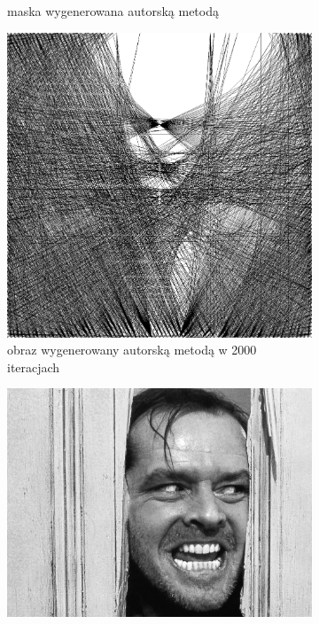 \begin{figure}[H]
\begin{subfigure}{0.32\textwidth}
        \caption{maska wygenerowana autorską metodą}
        \label{comp-comp-joker-shining-b}
    \end{subfigure}
    \begin{subfigure}{0.32\textwidth}
        \centering
        \includegraphics[width = \textwidth]{img/6-comp/joker_r_i2000_c20_inv0_bg10_obj5_ed5.png}
        \caption{obraz wygenerowany autorską metodą w 2000 iteracjach}
        \label{comp-comp-joker-shining-c}
    \end{subfigure}
    \begin{subfigure}{0.24\textwidth}
        \centering
        \includegraphics[width = \textwidth]{img/6-comp/shining_original_c10_inv0.png}

\end{subfigure}
\end{figure}
